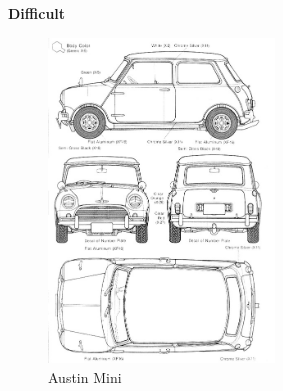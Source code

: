 \vspace{1cm}
\textbf{Difficult}\\
\begin{figure}[hb]
	\centering
		\includegraphics[width=6cm]{./img/mini.jpg}
		\caption{Austin Mini}
	\label{fig:Mini}
\end{figure}



